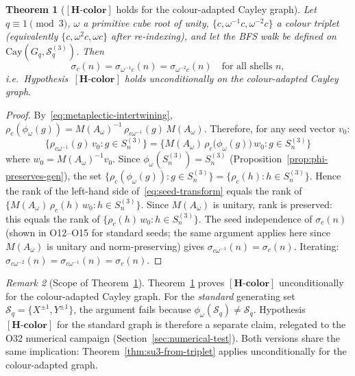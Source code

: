 \documentclass[11pt,a4paper]{article}
\newtheorem{theorem}{Theorem}[section]
\theoremstyle{definition}
\theoremstyle{remark}
\newtheorem{remark}[theorem]{Remark}
\newcommand{\Hcolor}{\mathbf{[H\text{-}color]}}
\newcommand{\Gq}{G_q}
\newcommand{\Sq}{\mathcal{S}_q}
\begin{document}
      \begin{theorem}[$\Hcolor$ holds for the colour-adapted Cayley graph]
        \label{thm:h-color-adapted}
        Let $q \equiv 1 \pmod 3$, $\omega$ a primitive cube root of unity, $\{c, \omega^{-1}c, \omega^{-2}c\}$
        a colour triplet (equivalently $\{c, \omega^2 c, \omega c\}$ after re-indexing), and let the
        BFS walk be defined on $\mathrm{Cay}(\Gq, \Sq^{(3)})$.
        Then
        \begin{equation}
          \sigma_c(n) = \sigma_{\omega^{-1}c}(n) = \sigma_{\omega^{-2}c}(n)
          \quad\text{for all shells } n,
        \end{equation}
        i.e.\ Hypothesis~$\Hcolor$ holds unconditionally on the colour-adapted Cayley graph.
      \end{theorem}

      \begin{proof}
        By~\eqref{eq:metaplectic-intertwining},
        $\rho_c(\phi_\omega(g)) = M(A_\omega)^{-1}\,\rho_{c\omega^{-1}}(g)\,M(A_\omega)$.
        Therefore, for any seed vector $v_0$:
        \begin{equation}
          \label{eq:seed-transform}
          \bigl\{\rho_{c\omega^{-1}}(g)\,v_0 : g \in S_n^{(3)}\bigr\}
          = \bigl\{M(A_\omega)\,\rho_c\bigl(\phi_\omega(g)\bigr)\,w_0 : g \in S_n^{(3)}\bigr\}
        \end{equation}
        where $w_0 = M(A_\omega)^{-1}v_0$.
        Since $\phi_\omega(S_n^{(3)}) = S_n^{(3)}$ (Proposition~\ref{prop:phi-preserves-gen}), the set
        $\{\rho_c(\phi_\omega(g)) : g \in S_n^{(3)}\} = \{\rho_c(h) : h \in S_n^{(3)}\}$.
        Hence the rank of the left-hand side of~\eqref{eq:seed-transform} equals the rank of
        $\{M(A_\omega)\,\rho_c(h)\,w_0 : h \in S_n^{(3)}\}$.
        Since $M(A_\omega)$ is unitary, rank is preserved: this equals the rank of
        $\{\rho_c(h)\,w_0 : h \in S_n^{(3)}\}$.
        The seed independence of $\sigma_c(n)$ (shown in O12--O15 for standard seeds; the same argument
        applies here since $M(A_\omega)$ is unitary and norm-preserving) gives
        $\sigma_{c\omega^{-1}}(n) = \sigma_c(n)$.
        Iterating: $\sigma_{c\omega^{-2}}(n) = \sigma_{c\omega^{-1}}(n) = \sigma_c(n)$.
      \end{proof}

      \begin{remark}[Scope of Theorem~\ref{thm:h-color-adapted}]
        \label{rmk:scope-adapted}
        Theorem~\ref{thm:h-color-adapted} proves $\Hcolor$ unconditionally for the colour-adapted
        Cayley graph.
        For the \emph{standard} generating set $\Sq = \{X^{\pm 1}, Y^{\pm 1}\}$, the argument
        fails because $\phi_\omega(\Sq) \neq \Sq$.
        Hypothesis~$\Hcolor$ for the standard graph is therefore a separate claim, relegated to the
        O32 numerical campaign (Section~\ref{sec:numerical-test}).
        Both versions share the same implication: Theorem~\ref{thm:su3-from-triplet} applies
        unconditionally for the colour-adapted graph.
      \end{remark}
\end{document}

